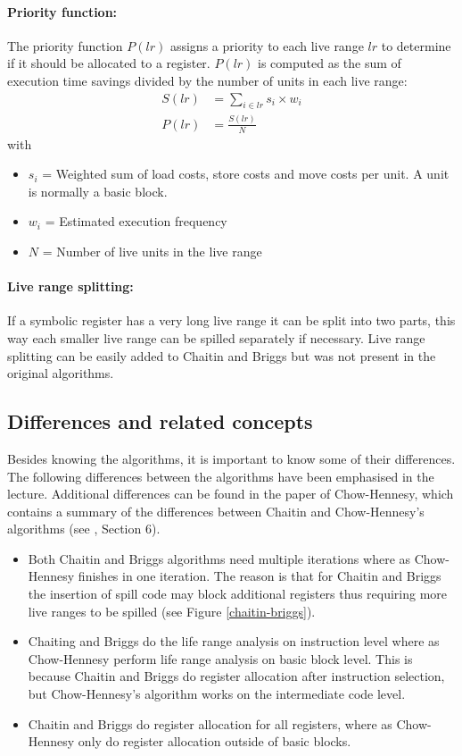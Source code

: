 \documentclass[a4paper,10pt]{article}
\begin{document}
\paragraph{Priority function:} The priority function $P(lr)$ assigns a priority to each live range $lr$ to determine if it should be
allocated to a register. $P(lr)$ is computed as the sum of execution time savings divided by the number of units in each live range:
\begin{align}
 S(lr) &= \sum_{i\in lr}{s_i \times w_i}\\
 P(lr) &= \frac{S(lr)}{N}
\end{align}
with
\begin{itemize}
 \item $s_i$ = Weighted sum of load costs, store costs and move costs per unit. A unit is normally a basic block.
 \item $w_i$ = Estimated execution frequency
 \item $N$ = Number of live units in the live range
\end{itemize}

\paragraph{Live range splitting:} If a symbolic register has a very long live range it can be split into two parts, this way each smaller
live range can be spilled separately if necessary. Live range splitting can be easily added to Chaitin and Briggs but was not present in
the original algorithms.

\subsection{Differences and related concepts}
Besides knowing the algorithms, it is important to know some of their differences. The following differences between the algorithms have
been emphasised in the lecture. Additional differences can be found in the paper of Chow-Hennesy, which contains a summary of the
differences between Chaitin and Chow-Hennesy's algorithms (see \cite{chowhennesy}, Section 6).

\begin{itemize}
 \item Both Chaitin and Briggs algorithms need multiple iterations where as Chow-Hennesy finishes in one iteration. The reason is that
       for Chaitin and Briggs the insertion of spill code may block additional registers thus requiring more live ranges to be spilled
       (see Figure \ref{chaitin-briggs}).
 \item Chaiting and Briggs do the life range analysis on instruction level where as Chow-Hennesy perform life range analysis
       on basic block level. This is because Chaitin and Briggs do register allocation after instruction selection, but Chow-Hennesy's
       algorithm works on the intermediate code level.
 \item Chaitin and Briggs do register allocation for all registers, where as Chow-Hennesy only do register allocation outside of basic
       blocks.
\end{itemize}
\end{document}
